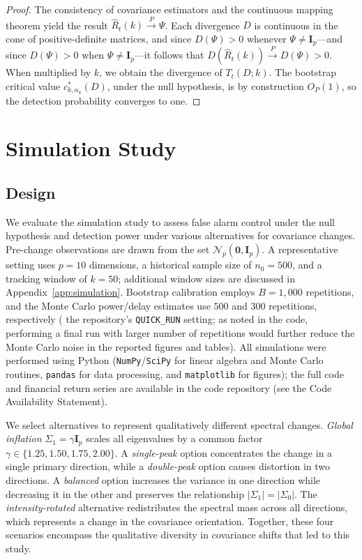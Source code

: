 \documentclass[11pt,a4paper]{article}
\newcommand{\I}{\mathbf{I}}
\newcommand{\calN}{\mathcal{N}}
\begin{document}
\begin{proof}
The consistency of covariance estimators and the continuous mapping theorem
yield the result $\widehat{R}_{t}(k)\xrightarrow{P}\Psi$. Each divergence $D$
is continuous in the cone of positive-definite matrices, and since $D(\Psi) > 0$
whenever $\Psi \neq \I_{p}$—and since $D(\Psi) > 0$ when $\Psi \neq \I_{p}$—it follows that $D(\widehat{R}_{t}(k))\xrightarrow{P}D(\Psi) > 0$.
When multiplied by $k$, we obtain the divergence of $T_{t}(D;k)$. The bootstrap
critical value $c_{k,\alpha_{k}}^{*}(D)$, under the null hypothesis,
is by construction $O_{P}(1)$, so the detection probability converges to one.
\end{proof}

\section{Simulation Study}
\label{sec:simulation}

\subsection{Design}

We evaluate the simulation study to assess false alarm control under the null hypothesis and
detection power under various alternatives for covariance changes. Pre-change
observations are drawn from the set $\calN_{p}(\mathbf{0},\I_{p})$.  A representative
setting uses $p=10$ dimensions, a historical sample size of $n_{0}=500$, and
a tracking window of $k=50$; additional window sizes
are discussed in Appendix~\ref{app:simulation}.  Bootstrap calibration employs $B=1{,}000$ repetitions, and the Monte Carlo
power/delay estimates use $500$ and $300$ repetitions, respectively (
the repository’s \texttt{QUICK\_RUN} setting; as noted in the code, performing a final run with larger
number of repetitions would further reduce the Monte Carlo noise in the reported
figures and tables).
All simulations were performed using \textsf{Python} (\texttt{NumPy}/\texttt{SciPy}
for linear algebra and Monte Carlo routines, \texttt{pandas} for
data processing, and \texttt{matplotlib} for figures); the full code and
financial return series are available in the code repository
(see the Code Availability Statement).

We select alternatives to represent qualitatively different spectral changes.
\emph{Global inflation} $\Sigma_{1}=\gamma\I_{p}$ scales all eigenvalues
by a common factor $\gamma\in\{1.25,1.50,1.75,2.00\}$.  A \emph{single-peak}
option concentrates the change in a single primary direction, while a
\emph{double-peak} option causes distortion in two directions.  A \emph{balanced}
option increases the variance in one direction while decreasing it in the other and
preserves the relationship $|\Sigma_{1}|=|\Sigma_{0}|$.  The \emph{intensity-rotated}
alternative redistributes the spectral mass across all directions, which
represents a change in the covariance orientation.  Together, these four scenarios
encompass the qualitative diversity in covariance shifts
that led to this study.
\end{document}
